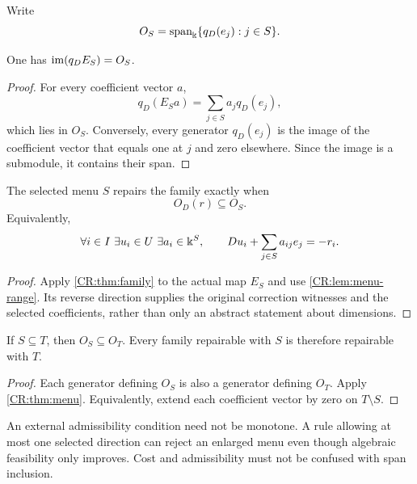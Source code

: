 Write
\[
O_S=\operatorname{span}_{\Bbbk}\{q_D(e_j):j\in S\}.
\]

\begin{CRlemma}\label{CR:lem:menu-range}
One has $\operatorname{im}(q_DE_S)=O_S$.
\end{CRlemma}
\begin{proof}
For every coefficient vector $a$,
\[
q_D(E_Sa)=\sum_{j\in S}a_jq_D(e_j),
\]
which lies in $O_S$. Conversely, every generator $q_D(e_j)$ is the image of the coefficient vector that equals one at $j$ and zero elsewhere. Since the image is a submodule, it contains their span.
\end{proof}

\begin{CRtheorem}\label{CR:thm:menu}
The selected menu $S$ repairs the family exactly when
\begin{equation}\label{CR:eq:menu-criterion}
O_D(r)\subseteq O_S.
\end{equation}
Equivalently,
\[
\forall i\in I\ \exists u_i\in U\ \exists a_i\in\Bbbk^S,
\qquad Du_i+\sum_{j\in S}a_{ij}e_j=-r_i.
\]
\end{CRtheorem}
\begin{proof}
Apply \cref{CR:thm:family} to the actual map $E_S$ and use \cref{CR:lem:menu-range}. Its reverse direction supplies the original correction witnesses and the selected coefficients, rather than only an abstract statement about dimensions.
\end{proof}

\begin{CRproposition}\label{CR:prop:menu-mono}
If $S\subseteq T$, then $O_S\subseteq O_T$. Every family repairable with $S$ is therefore repairable with $T$.
\end{CRproposition}
\begin{proof}
Each generator defining $O_S$ is also a generator defining $O_T$. Apply \cref{CR:thm:menu}. Equivalently, extend each coefficient vector by zero on $T\setminus S$.
\end{proof}

An external admissibility condition need not be monotone. A rule allowing at most one selected direction can reject an enlarged menu even though algebraic feasibility only improves. Cost and admissibility must not be confused with span inclusion.

